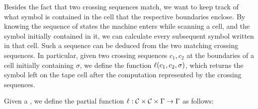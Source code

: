 Besides the fact that two crossing sequences match, we want to keep track of what symbol is contained in the cell that the respective boundaries enclose.
By knowing the sequence of states the machine enters while scanning a cell, and the symbol initially contained in it, we can calculate every subsequent symbol written in that cell.
Such a sequence can be deduced from the two matching crossing sequences.
In particular, given two crossing sequences $c_1,c_2$ at the boundaries of a cell initially containing $\sigma$, we define the function $\ell(c_1,c_2,\sigma)$, which returns the symbol left on the tape cell after the computation represented by the crossing sequences.
\begin{defn}
	Given a \kDLA, we define the partial function $\ell:\mathcal C\times\mathcal C\times\Gamma\to\Gamma$ as follows:


\end{defn}
